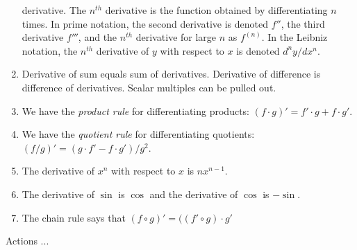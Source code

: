 \documentclass[10pt]{amsart}
\begin{document}
\begin{enumerate}
  derivative. The $n^{th}$ derivative is the function obtained by
  differentiating $n$ times. In prime notation, the second derivative
  is denoted $f''$, the third derivative $f'''$, and the $n^{th}$
  derivative for large $n$ as $f^{(n)}$. In the Leibniz notation, the
  $n^{th}$ derivative of $y$ with respect to $x$ is denoted
  $d^ny/dx^n$.
\item Derivative of sum equals sum of derivatives. Derivative of
  difference is difference of derivatives. Scalar multiples can be pulled out.
\item We have the {\em product rule} for differentiating products: $(f
  \cdot g)' = f' \cdot g + f \cdot g'$.
\item We have the {\em quotient rule} for differentiating quotients:
  $(f/g)' = (g \cdot f' - f \cdot g')/g^2$.
\item The derivative of $x^n$ with respect to $x$ is $nx^{n-1}$.
\item The derivative of $\sin$ is $\cos$ and the derivative of $\cos$
  is $-\sin$.
\item The chain rule says that $(f \circ g)' = ( (f' \circ g) \cdot g'$
\end{enumerate}

Actions ...
\end{document}
